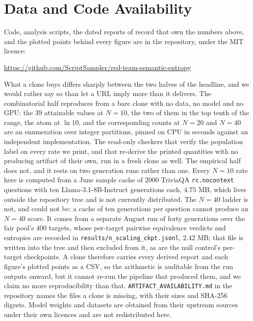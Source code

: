 \documentclass[10pt,letterpaper]{article}
\begin{document}
\section*{Data and Code Availability}
Code, analysis scripts, the dated reports of record that own the numbers above, and the
plotted points behind every figure are in the repository, under the MIT licence:
\begin{center}
\url{https://github.com/ScriptSampler/red-team-semantic-entropy}
\end{center}
\noindent
What a clone buys differs sharply between the two halves of the headline, and we would rather say
so than let a URL imply more than it delivers. The combinatorial half reproduces from a bare
clone with no data, no model and no GPU: the $39$ attainable values at $N{=}10$, the two of
them in the top tenth of the range, the atom at $\ln 10$, and the corresponding counts at
$N{=}20$ and $N{=}40$ are an enumeration over integer partitions, pinned on CPU in seconds
against an independent implementation. The read-only checkers that verify the population
label on every rate we print, and that re-derive the printed quantities with no producing
artifact of their own, run in a fresh clone as well. The empirical half does not, and it rests
on two generation runs rather than one. Every $N{=}10$ rate here is computed from a June sample
cache of $2000$ TriviaQA \texttt{rc.nocontext} questions with ten Llama-3.1-8B-Instruct
generations each, $4.75$ MB, which lives outside the repository tree and is not currently
distributed. The $N{=}40$ ladder is not, and could not be: a cache of ten generations per
question cannot produce an $N{=}40$ score. It comes from a separate August run of forty
generations over the fair pool's $400$ targets, whose per-target pairwise equivalence verdicts
and entropies are recorded in \texttt{results/n\_scaling\_ckpt.jsonl}, $2.42$ MB; that file is
written into the tree and then excluded from it, as are the null control's per-target
checkpoints. A clone therefore carries every derived report and each figure's plotted points
as a CSV, so the arithmetic is auditable from the run outputs onward, but it cannot re-run the
pipeline that produced them, and we claim no more reproducibility than that.
\texttt{ARTIFACT\_AVAILABILITY.md} in the repository names the
files a clone is missing, with their sizes and SHA-256 digests. Model weights and datasets
are obtained from their upstream sources under their own licences and are not redistributed
here.



\end{document}
